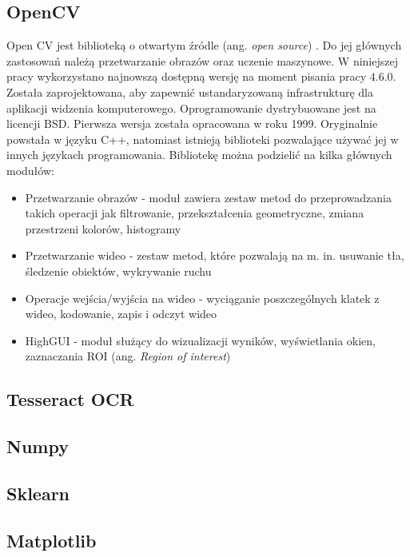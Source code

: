 \subsection{OpenCV}
Open CV jest biblioteką o otwartym źródle (ang. \textit{open source}) \cite{open_cv,open_cv_docs} .
Do jej głównych zastosowań należą przetwarzanie obrazów oraz uczenie maszynowe.
W niniejszej pracy wykorzystano najnowszą dostępną wersję na moment pisania pracy $4.6.0$.
Została zaprojektowana, aby zapewnić ustandaryzowaną infrastrukturę dla aplikacji widzenia komputerowego.
Oprogramowanie dystrybuowane jest na licencji BSD.
Pierwsza wersja została opracowana w roku 1999.
Oryginalnie powstała w języku C++, natomiast istnieją biblioteki pozwalające używać jej w innych językach programowania.
Bibliotekę można podzielić na kilka głównych modułów:
\begin{itemize}
    \item Przetwarzanie obrazów - moduł zawiera zestaw metod do przeprowadzania takich operacji jak filtrowanie, przekształcenia geometryczne, zmiana przestrzeni kolorów, histogramy
    \item Przetwarzanie wideo - zestaw metod, które pozwalają na m. in. usuwanie tła, śledzenie obiektów, wykrywanie ruchu
    \item Operacje wejścia/wyjścia na wideo - wyciąganie poszczególnych klatek z wideo, kodowanie, zapis i odczyt wideo
    \item HighGUI - moduł służący do wizualizacji wyników, wyświetlania okien, zaznaczania ROI (ang. \textit{Region of interest})
\end{itemize}

\subsection{Tesseract OCR}

\subsection{Numpy}

\subsection{Sklearn}

\subsection{Matplotlib}